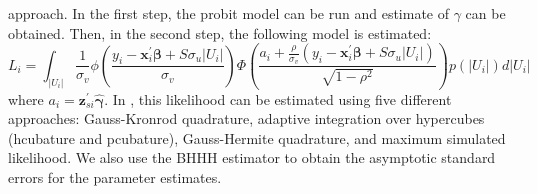 \documentclass[nojss]{jss}
\begin{document}
 approach. In the first step, the probit model can be run and estimate of 
 $\gamma$ can be obtained. Then, in the second step, the following model 
 is estimated:
 \begin{equation}\label{eq:3.1.9}
 L_i = \int_{|U_i|} \frac{1}{\sigma_v}\phi\left(\frac{y_{i}-
 \mathbf{x}_{i}^{\prime} \bm{\beta} + S\sigma_u|U_i|}{\sigma_v}\right) 
 \Phi\left(\frac{a_i + \frac{\rho}{\sigma_v}\left(y_{i}-
 \mathbf{x}_{i}^{\prime} \bm{\beta} + S\sigma_u|U_i|\right)}{\sqrt{1-\rho^2}}
 \right)p\left(|U_i|\right)d|U_i| 
 \end{equation}
 where $a_i = \mathbf{z}_{si}^{\prime} \hat{\bm{\gamma}}$. In , this 
 likelihood can be estimated using five different approaches: Gauss-Kronrod quadrature, 
 adaptive integration over hypercubes (hcubature and pcubature), Gauss-Hermite 
 quadrature, and maximum simulated likelihood. We also use the BHHH estimator 
 to obtain the asymptotic standard errors for the parameter estimates.
 
\end{document}
